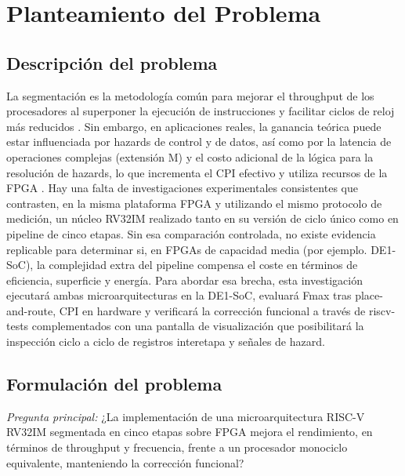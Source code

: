 \section{Planteamiento del Problema}
\label{sec:problema}

\subsection{Descripción del problema}
La segmentación es la metodología común para mejorar el throughput de los procesadores al superponer la ejecución de instrucciones y facilitar ciclos de reloj más reducidos \parencite{Patterson2017Computer}. Sin embargo, en aplicaciones reales, la ganancia teórica puede estar influenciada por hazards de control y de datos, así como por la latencia de operaciones complejas (extensión M) y el costo adicional de la lógica para la resolución de hazards, lo que incrementa el CPI efectivo y utiliza recursos de la FPGA \parencite{RISCV2019Manual, Chu2011FPGA}.
Hay una falta de investigaciones experimentales consistentes que contrasten, en la misma plataforma FPGA y utilizando el mismo protocolo de medición, un núcleo RV32IM realizado tanto en su versión de ciclo único como en pipeline de cinco etapas. Sin esa comparación controlada, no existe evidencia replicable para determinar si, en FPGAs de capacidad media (por ejemplo. DE1-SoC), la complejidad extra del pipeline compensa el coste en términos de eficiencia, superficie y energía. Para abordar esa brecha, esta investigación ejecutará ambas microarquitecturas en la DE1-SoC, evaluará Fmax tras place-and-route, CPI en hardware y verificará la corrección funcional a través de riscv-tests complementados con una pantalla de visualización que posibilitará la inspección ciclo a ciclo de registros interetapa y señales de hazard.


\subsection{Formulación del problema}

\textit{Pregunta principal:} ¿La implementación de una microarquitectura RISC-V RV32IM segmentada en cinco etapas sobre FPGA
mejora el rendimiento, en términos de throughput y frecuencia, frente a un procesador monociclo
equivalente, manteniendo la corrección funcional?




